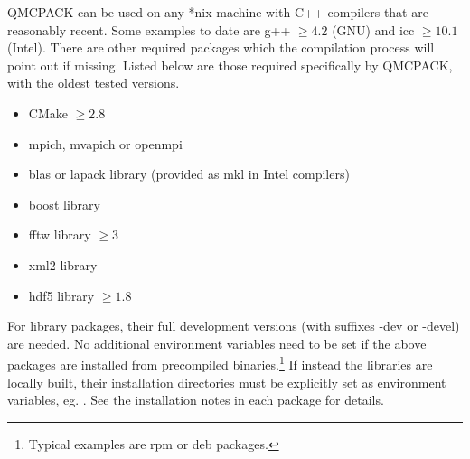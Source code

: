 QMCPACK can be used on any *nix machine with C++ compilers that are reasonably recent.  Some examples to date are g++ $\geq 4.2$ (GNU) and icc $\geq 10.1$ (Intel).  There are other required packages which the compilation process will point out if missing.  Listed below are those required specifically by QMCPACK, with the oldest tested versions.
\begin{itemize}
\item{} CMake $\geq 2.8$
\item{} mpich, mvapich or openmpi
\item{} blas or lapack library (provided as mkl in Intel compilers)
\item{} boost library
\item{} fftw library $\geq 3$
\item{} xml2 library
\item{} hdf5 library $\geq 1.8$
\end{itemize}
For library packages, their full development versions (with suffixes -dev or -devel) are needed.  No additional environment variables need to be set if the above packages are installed from precompiled binaries.\footnote{Typical examples are rpm or deb packages.}  If instead the libraries are locally built, their installation directories must be explicitly set as environment variables, eg. .  See the installation notes in each package for details.

